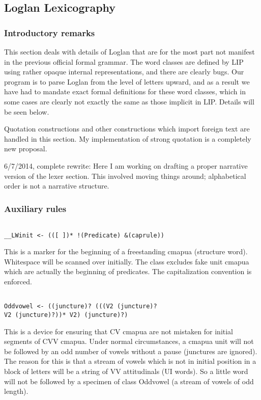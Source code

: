 \documentclass[12pt]{article}
\begin{document}
\subsection{Loglan Lexicography}

\subsubsection{Introductory remarks}

This section deals with details of Loglan that are for the most part not manifest in the previous official formal grammar.
The word classes are defined by LIP using rather opaque internal representations, and there are clearly bugs.
Our program is to parse Loglan from the level of letters upward, and as a result we have had to mandate exact formal definitions for these word classes, which in some cases are clearly not exactly the same as those implicit in LIP.  Details will be seen below.  

Quotation constructions and other constructions which import foreign text are handled in this section.  My implementation of
strong quotation is a completely new proposal.

6/7/2014, complete rewrite:  Here I am working on drafting a proper narrative version of the lexer section.  This involved moving things around; alphabetical order is not a narrative structure.

\subsubsection{Auxiliary rules}

\begin{verbatim}

__LWinit <- (([ ])* !(Predicate) &(caprule))

\end{verbatim}

This is a marker for the beginning of a freestanding cmapua (structure word).  Whitespace will
be scanned over initially.  The class excludes fake unit cmapua which are actually the beginning of predicates.
The capitalization convention is enforced.

\begin{verbatim}

Oddvowel <- ((juncture)? (((V2 (juncture)? 
V2 (juncture)?))* V2) (juncture)?)

\end{verbatim}

This is a device for ensuring that CV cmapua are not mistaken for initial segments of CVV cmapua.  Under normal circumstances, a cmapua unit will not be followed by an odd number of vowels without a pause (junctures are ignored).  The reason for this
is that a stream of vowels which is not in initial position in a block of letters will be a string of VV attitudinals (UI words).
So a little word will not be followed by a specimen of class Oddvowel (a stream of vowels of odd length).
\end{document}
